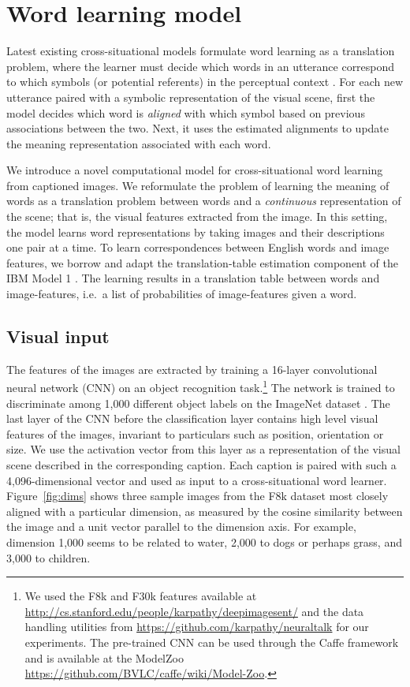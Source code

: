 

\section{Word learning model}
\label{sec:models}
Latest existing cross-situational models formulate word learning as a
translation problem, where the learner must decide which words in an
utterance correspond to which symbols (or potential referents) in the
perceptual context \cite{yu2007unified,fazly.etal.10csj}. For each new
utterance paired with a symbolic representation of the visual scene,
first the model decides which word is {\it aligned} with which symbol
based on previous associations between the two. Next, it uses the
estimated alignments to update the meaning representation associated
with each word.

We introduce a novel computational model for cross-situational word
learning from captioned images. We reformulate the problem of learning
the meaning of words as a translation problem between words and a {\it
  continuous} representation of the scene; that is, the visual
features extracted from the image. In this setting, the model learns
word representations by taking images and their descriptions one pair
at a time. To learn correspondences between English words and image
features, we borrow and adapt the translation-table estimation
component of the IBM Model 1 \cite{BrownPPM94}. The learning results
in a translation table between words and image-features, i.e.\ a list
of probabilities of image-features given a word.

\subsection{Visual input}
The features of the images are extracted by training a 16-layer
convolutional neural network (CNN) \cite{simonyan2014very} on an
object recognition task.\label{rev:cnndetail}\footnote{We used the F8k
  and F30k features available at
  \url{http://cs.stanford.edu/people/karpathy/deepimagesent/} and the
  data handling utilities from
  \url{https://github.com/karpathy/neuraltalk} for our
  experiments. The pre-trained CNN can be used through the Caffe
  framework \cite{jia2014caffe} and is available at the ModelZoo
  \url{https://github.com/BVLC/caffe/wiki/Model-Zoo}.} The network is
trained to discriminate among 1,000 different object labels on the
ImageNet dataset \cite{deng2009imagenet}. The last layer of the CNN
before the classification layer contains high level visual features of
the images, invariant to particulars such as position, orientation or
size.  We use the activation vector from this layer as a
representation of the visual scene described in the corresponding
caption. Each caption is paired with such a 4,096-dimensional vector
and used as input to a cross-situational word learner.
Figure~\ref{fig:dims} shows three sample images from the F8k
dataset most closely aligned with a particular dimension, as measured
by the cosine similarity between the image and a unit vector parallel
to the dimension axis. For example, dimension 1,000 seems to be related
to water, 2,000 to dogs or perhaps grass, and 3,000 to children.

